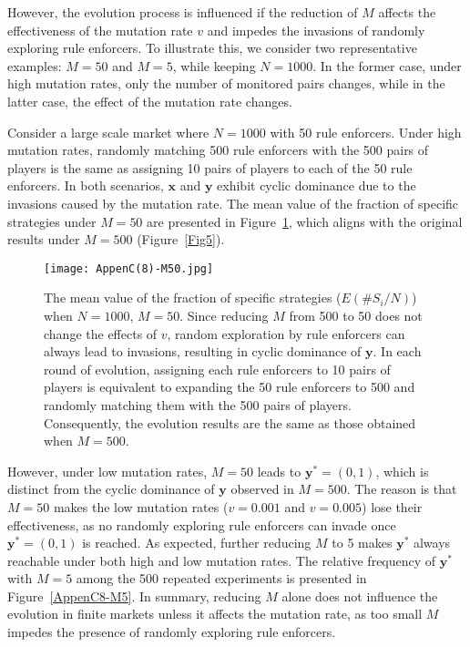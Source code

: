 \documentclass[letterpaper,10pt]{article}
\numberwithin{equation}{section}
\begin{document}
However, the evolution process is influenced if the reduction of $ M $ affects the effectiveness of the mutation rate $ v $ and impedes the invasions of randomly exploring rule enforcers. To illustrate this, we consider two representative examples: $ M = 50 $ and $ M = 5 $, while keeping $ N = 1000 $. In the former case, under high mutation rates, only the number of monitored pairs changes, while in the latter case, the effect of the mutation rate changes.

Consider a large scale market where $ N = 1000 $ with 50 rule enforcers. Under high mutation rates, randomly matching 500 rule enforcers with the 500 pairs of players is the same as assigning 10 pairs of players to each of the 50 rule enforcers. In both scenarios, $ \mathbf{x} $ and $ \mathbf{y} $ exhibit cyclic dominance due to the invasions caused by the mutation rate. The mean value of the fraction of specific strategies under $ M=50 $ are presented in Figure~\ref{AppenC8-M50}, which aligns with the original results under $ M=500 $ (Figure~\ref{Fig5}).

\begin{figure}[H]
    \begin{center}
        \texttt{[image: AppenC(8)-M50.jpg]}
    \end{center}
    \caption{The mean value of the fraction of specific strategies ($ E(\# S_{i}/N) $) when $ N = 1000 $, $ M = 50 $. Since reducing $ M $ from 500 to 50 does not change the effects of $ v $, random exploration by rule enforcers can always lead to invasions, resulting in cyclic dominance of $ \mathbf{y} $. In each round of evolution, assigning each rule enforcers to 10 pairs of players is equivalent to expanding the 50 rule enforcers to 500 and randomly matching them with the 500 pairs of players. Consequently, the evolution results are the same as those obtained when $ M = 500 $.}\label{AppenC8-M50}
\end{figure}

However, under low mutation rates, $ M = 50 $ leads to $ \mathbf{y}^* = (0, 1) $, which is distinct from the cyclic dominance of $ \mathbf{y} $ observed in $ M=500 $. The reason is that $ M = 50 $ makes the low mutation rates ($ v = 0.001 $ and $ v=0.005 $) lose their effectiveness, as no randomly exploring rule enforcers can invade once $ \mathbf{y}^* = (0,1) $ is reached. As expected, further reducing $ M $ to 5 makes $ \mathbf{y}^* $ always reachable under both high and low mutation rates. The relative frequency of $ \mathbf{y}^* $ with $ M = 5 $ among the 500 repeated experiments is presented in Figure~\ref{AppenC8-M5}. In summary, reducing $ M $ alone does not influence the evolution in finite markets unless it affects the mutation rate, as too small $ M $ impedes the presence of randomly exploring rule enforcers.
\end{document}
